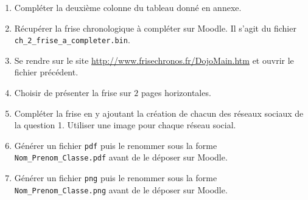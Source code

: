 \documentclass[a4paper, dvipsnames]{article}
\begin{document}
\begin{activite}{}{}
  \begin{enumerate}
    \item Compléter la deuxième colonne du tableau donné en annexe.
    \item Récupérer la frise chronologique à compléter sur Moodle. Il s'agit du fichier \verb|ch_2_frise_a_completer.bin|.
    \item Se rendre sur le site \href{http://www.frisechronos.fr/DojoMain.htm}{http://www.frisechronos.fr/DojoMain.htm} et ouvrir le fichier précédent.
    \item Choisir de présenter la frise sur $2$ pages horizontales.
    \item Compléter la frise en y ajoutant la création de chacun des réseaux sociaux de la question 1. Utiliser une image pour chaque réseau social.
    \item Générer un fichier \verb|pdf| puis le renommer sous la forme \verb|Nom_Prenom_Classe.pdf| avant de le déposer sur Moodle.
    \item Générer un fichier \verb|png| puis le renommer sous la forme \verb|Nom_Prenom_Classe.png| avant de le déposer sur Moodle.
  \end{enumerate} 
\end{activite}
\end{document}
